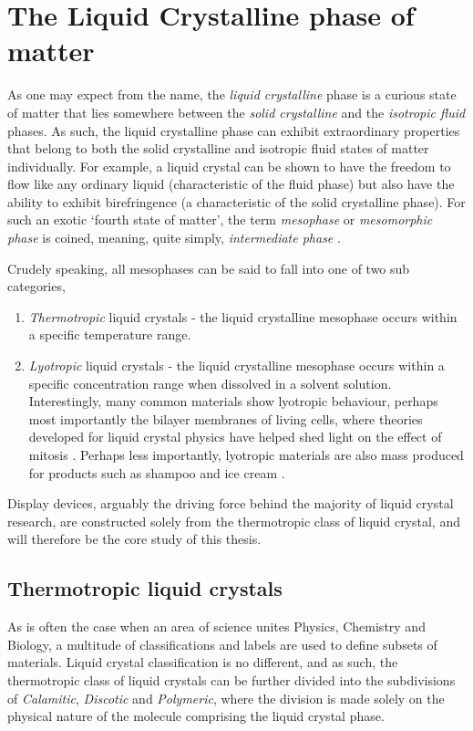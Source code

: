 \chapter{The Liquid Crystalline phase of matter} 

As one may expect from the name, the \textit{liquid crystalline} phase is a curious state of matter that lies somewhere between the \textit{solid crystalline} and the \textit{isotropic fluid} phases. As such, the liquid crystalline phase can exhibit extraordinary properties that belong to both the solid crystalline and isotropic fluid states of matter individually. For example, a liquid crystal can be shown to have the freedom to flow like any ordinary liquid (characteristic of the fluid phase) but also have the ability to exhibit birefringence (a characteristic of the solid crystalline phase). For such an exotic `fourth state of matter', the term \textit{mesophase} or \textit{mesomorphic phase} is coined, meaning, quite simply, \textit{intermediate phase} \citep{Vertogen1988}. 

Crudely speaking, all mesophases can be said to fall into one of two sub categories,

\begin{enumerate}
	\item \textit{Thermotropic} liquid crystals - the liquid crystalline mesophase occurs within a specific temperature range.
	\item \textit{Lyotropic} liquid crystals - the liquid crystalline mesophase occurs within a specific concentration range when dissolved in a solvent solution. Interestingly, many common materials show lyotropic behaviour, perhaps most importantly the bilayer membranes of living cells, where theories developed for liquid crystal physics have helped shed light on the effect of mitosis \citep{Lydon2006}. Perhaps less importantly, lyotropic materials are also mass produced for products such as shampoo and ice cream \cite{Taphouse2007}.
\end{enumerate}

Display devices, arguably the driving force behind the majority of liquid crystal research, are constructed solely from the thermotropic class of liquid crystal, and will therefore be the core study of this thesis.

\section{Thermotropic liquid crystals}
\label{sec:Thermotropic_liquid_crystals}
As is often the case when an area of science unites Physics, Chemistry and Biology, a multitude of classifications and labels are used to define subsets of materials. Liquid crystal classification is no different, and as such, the thermotropic class of liquid crystals can be further divided into the subdivisions of \textit{Calamitic}, \textit{Discotic} and \textit{Polymeric}, where the division is made solely on the physical nature of the molecule comprising the liquid crystal phase.

